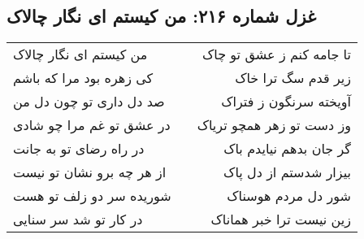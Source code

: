 \begin{center}
\section*{غزل شماره ۲۱۶: من کیستم ای نگار چالاک}
\label{sec:216}
\begin{longtable}{l p{0.5cm} r}
من کیستم ای نگار چالاک
&&
تا جامه کنم ز عشق تو چاک
\\
کی زهره بود مرا که باشم
&&
زیر قدم سگ ترا خاک
\\
صد دل داری تو چون دل من
&&
آویخته سرنگون ز فتراک
\\
در عشق تو غم مرا چو شادی
&&
وز دست تو زهر همچو تریاک
\\
در راه رضای تو به جانت
&&
گر جان بدهم نیایدم باک
\\
از هر چه برو نشان تو نیست
&&
بیزار شدستم از دل پاک
\\
شوریده سر دو زلف تو هست
&&
شور دل مردم هوسناک
\\
در کار تو شد سر سنایی
&&
زین نیست ترا خبر هماناک
\\
\end{longtable}
\end{center}
